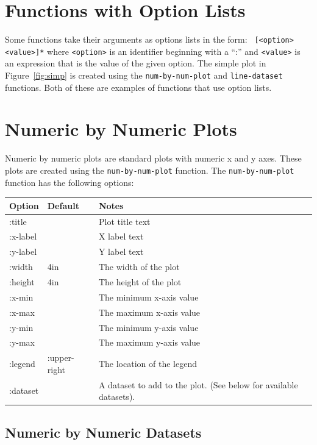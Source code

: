 \documentclass{article}
\begin{document}
\section{Functions with Option Lists}

Some functions take their arguments as options lists in the form: {\tt
  [<option> <value>]*} where {\tt <option>} is an identifier beginning
with a ``:'' and {\tt <value>} is an expression that is the value of
the given option.  The simple plot in Figure~\ref{fig:simp} is created
using the {\tt num-by-num-plot} and {\tt line-dataset} functions.
Both of these are examples of functions that use option lists.

\section{\label{sect:num-by-num} Numeric by Numeric Plots}

Numeric by numeric plots are standard plots with numeric x and y axes.
These plots are created using the {\tt num-by-num-plot} function.  The
{\tt num-by-num-plot} function has the following options:

\begin{center}
\begin{tabular}{lll}
Option & Default & Notes \\
\hline
:title & & Plot title text\\
:x-label & & X label text\\
:y-label & & Y label text\\
:width & 4in & The width of the plot\\
:height & 4in & The height of the plot\\
:x-min & & The minimum x-axis value\\
:x-max & & The maximum x-axis value\\
:y-min & & The minimum y-axis value\\
:y-max & & The maximum y-axis value\\
:legend & :upper-right & The location of the legend \\
:dataset & & A dataset to add to the plot.  (See below for available
datasets).\\
\end{tabular}
\end{center}

\subsection{Numeric by Numeric Datasets}
\end{document}

